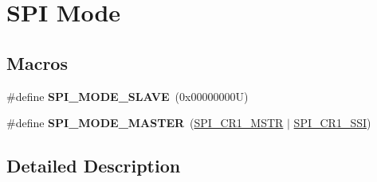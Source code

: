 \hypertarget{group___s_p_i___mode}{}\section{S\+PI Mode}
\label{group___s_p_i___mode}
\subsection*{Macros}
\begin{DoxyCompactItemize}
\item 
\mbox{\label{group___s_p_i___mode_ga75f094fee5a9dc10b88401ccd17925d3}} 
\#define {\bfseries S\+P\+I\+\_\+\+M\+O\+D\+E\+\_\+\+S\+L\+A\+VE}~(0x00000000\+U)
\item 
\mbox{\label{group___s_p_i___mode_gaa335c2abdfad9e6f6c2677719d93b64e}} 
\#define {\bfseries S\+P\+I\+\_\+\+M\+O\+D\+E\+\_\+\+M\+A\+S\+T\+ER}~(\mbox{\hyperlink{group___peripheral___registers___bits___definition_ga5b3b6ae107fc37bf18e14506298d7a55}{S\+P\+I\+\_\+\+C\+R1\+\_\+\+M\+S\+TR}} $\vert$ \mbox{\hyperlink{group___peripheral___registers___bits___definition_ga5f154374b58c0234f82ea326cb303a1e}{S\+P\+I\+\_\+\+C\+R1\+\_\+\+S\+SI}})
\end{DoxyCompactItemize}


\subsection{Detailed Description}
